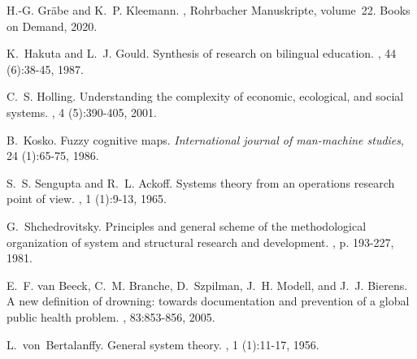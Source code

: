 \documentclass[a4paper,11pt]{article}
\begin{document}
\begin{thebibliography}{10}
 H.-G. Gr{\"a}be and K.~P. Kleemann.  ,
  Rohrbacher Manuskripte, volume~22.  \newblock Books on Demand, 2020.

 K.~Hakuta and L.~J. Gould.  \newblock Synthesis
  of research on bilingual education.  ,
  44 (6):38-45, 1987.

 C.~S. Holling.  \newblock Understanding the
  complexity of economic, ecological, and social systems.  , 4 (5):390-405, 2001.

 B.~Kosko.  \newblock Fuzzy cognitive maps.  \newblock
  {\em International journal of man-machine studies}, 24 (1):65-75, 1986.

 S.~S. Sengupta and R.~L. Ackoff.  \newblock
  Systems theory from an operations research point of view.  , 1 (1):9-13, 1965.

 G.~Shchedrovitsky.  \newblock
  Principles and general scheme of the methodological organization of system
  and structural research and development.  , p.  193-227,
  1981.

 E.~F. van Beeck, C.~M. Branche, D.~Szpilman,
  J.~H. Modell, and J.~J. Bierens.  \newblock A new definition of drowning:
  towards documentation and prevention of a global public health problem.
  , 83:853-856,
  2005.

 L.~von~Bertalanffy.  \newblock General system theory.
  , 1 (1):11-17, 1956.

\end{thebibliography}
\end{document}
